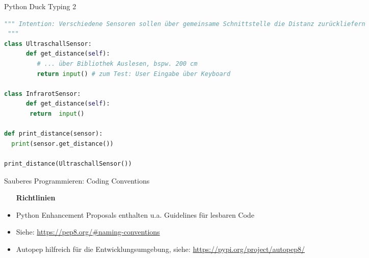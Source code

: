 \begin{frame}[fragile]{Python Duck Typing 2}
\begin{lstlisting}[language=Python]
 """ Intention: Verschiedene Sensoren sollen über gemeinsame Schnittstelle die Distanz zurückliefern
 """
class UltraschallSensor:
	  def get_distance(self):
	     # ... über Bibliothek Auslesen, bspw. 200 cm
	     return input() # zum Test: User Eingabe über Keyboard
             
class InfrarotSensor:
	  def get_distance(self):
	   return  input()

def print_distance(sensor):
  print(sensor.get_distance())

print_distance(UltraschallSensor())

\end{lstlisting}
\end{frame}


\begin{frame}[fragile]{Sauberes Programmieren: Coding Conventions}
    \begin{itemize}
    \setlength{\itemindent}{.5in}
     \item [\textbf{ Richtlinien}]
    \end{itemize}
    \begin{itemize}
        \item Python Enhancement Proposals enthalten u.a. Guidelines für lesbaren Code
        \item Siehe: \url{https://pep8.org/#naming-conventions}
        \item Autopep hilfreich für die Entwicklungsumgebung, siehe:  \url{https://pypi.org/project/autopep8/}
     \end{itemize}
\end{frame}



